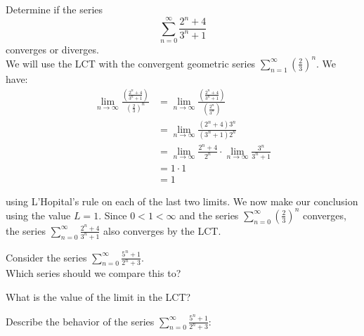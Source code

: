 \documentclass{ximera}
\begin{document}
\begin{example}
Determine if the series 
\[
\sum_{n=0}^\infty \frac{2^n + 4}{3^n + 1}
\]
converges or diverges.\\
We will use the LCT with the convergent geometric series $\displaystyle{\sum_{n=1}^\infty \left(\frac23\right)^n}$. We have:
\begin{align*}
\lim_{n \to \infty} \frac{\left(\frac{2^n + 4}{3^n + 1}\right)}{\left(\frac23\right)^n} &= \lim_{n \to \infty} \frac{\left(\frac{2^n + 4}{3^n + 1}\right)}{\left(\frac{2^n}{3^n}\right)}\\
&=\lim_{n \to \infty} \frac{(2^n + 4)3^n}{(3^n + 1)2^n}\\
&= \lim_{n \to \infty} \frac{2^n + 4}{2^n} \cdot \lim_{n \to \infty}\frac{3^n}{3^n + 1}\\
&= 1 \cdot 1 \\
&= 1
\end{align*}

using L'Hopital's rule on each of the last two limits. We now make our conclusion using the value $L = 1$. Since $0 < 1 < \infty$ and the series $\displaystyle{\sum_{n=0}^\infty \left(\frac23\right)^n}$
converges, the series $\displaystyle{\sum_{n=0}^\infty \frac{2^n + 4}{3^n + 1}}$ also converges by the LCT.
\end{example}




\begin{problem}
Consider the series $\displaystyle{\sum_{n=0}^\infty \frac{5^n + 1}{2^n + 3}}$.\\
Which series should we compare this to?

\begin{multipleChoice}
\end{multipleChoice}

What is the value of the limit in the LCT?
\begin{multipleChoice}
\end{multipleChoice}

Describe the behavior of the series $\displaystyle{\sum_{n=0}^\infty \frac{5^n + 1}{2^n + 3}:}$
\begin{multipleChoice}
\end{multipleChoice}

\end{problem}
\end{document}
